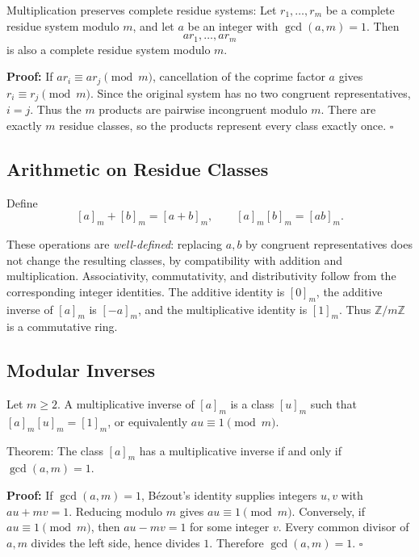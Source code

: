\documentclass[a4paper,11pt,abstracton]{scrartcl}
\theoremstyle{dotlessP}
\theoremstyle{dotlessS}
\theoremstyle{remark}
\theoremstyle{definition}
\begin{document}
\begin{mainbox}{Multiplication preserves complete residue systems:}
Let $r_1,\ldots,r_m$ be a complete residue system modulo $m$, and
let $a$ be an integer with $\gcd(a,m)=1$. Then
\[
    ar_1,\ldots,ar_m
\]
is also a complete residue system modulo $m$.
\end{mainbox}

\textbf{Proof:}
If $ar_i\equiv ar_j\pmod m$, cancellation of the coprime factor $a$
gives $r_i\equiv r_j\pmod m$. Since the original system has no two
congruent representatives, $i=j$. Thus the $m$ products are pairwise
incongruent modulo $m$. There are exactly $m$ residue classes, so the
products represent every class exactly once.
\hfill$\square$


\subsection{Arithmetic on Residue Classes}

\begin{definition_box}
Define
\[
    [a]_m+[b]_m=[a+b]_m,\qquad
    [a]_m[b]_m=[ab]_m.
\]
\end{definition_box}

These operations are \emph{well-defined}: replacing $a,b$ by congruent
representatives does not change the resulting classes, by compatibility
with addition and multiplication. Associativity, commutativity, and
distributivity follow from the corresponding integer identities.
The additive identity is $[0]_m$, the additive inverse of $[a]_m$ is
$[-a]_m$, and the multiplicative identity is $[1]_m$.
Thus $\mathbb{Z}/m\mathbb{Z}$ is a commutative ring.

\subsection{Modular Inverses}


\begin{definition_box}
Let $m\geq2$. A multiplicative inverse of $[a]_m$ is a class $[u]_m$
such that $[a]_m[u]_m=[1]_m$, or equivalently $au\equiv1\pmod m$.
\end{definition_box}


\begin{mainbox}{Theorem:}
The class $[a]_m$ has a multiplicative inverse if and only if
$\gcd(a,m)=1$.
\end{mainbox}

\textbf{Proof:}
If $\gcd(a,m)=1$, B\'ezout's identity supplies integers $u,v$ with
$au+mv=1$. Reducing modulo $m$ gives $au\equiv1\pmod m$.
Conversely, if $au\equiv1\pmod m$, then $au-mv=1$ for some integer
$v$. Every common divisor of $a,m$ divides the left side, hence divides
$1$. Therefore $\gcd(a,m)=1$.
\hfill$\square$
\end{document}
